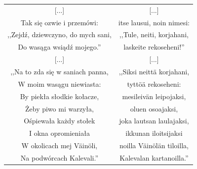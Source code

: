 \documentclass[11pt,a4paper,twoside]{report}
\begin{document}
{\centering
\small
\begin{longtable}{c c}
{[...]} & {[...]}\\
Tak się ozwie i przemówi: & itse lausui, noin nimesi:\\
,,Zejdź, dziewczyno, do mych sani, & ,,Tule, neiti, korjahani,\\
Do wasąga wsiądź mojego.'' & laskeite rekoseheni!''\\ \newpage
{[...]} & {[...]}\\
,,Na to zda się w saniach panna, & ,,Siksi neittä korjahani,\\
W moim wasągu niewiasta: & tyttöä rekoseheni:\\
By piekła słodkie kołacze, & mesileivän leipojaksi,\\
Żeby piwo mi warzyła, & oluen osoajaksi,\\
Ośpiewała każdy stołek & joka lautsan laulajaksi,\\
I okna opromieniała & ikkunan iloitsijaksi\\
W okolicach mej Väinöli, & noilla Väinölän tiloilla,\\
Na podwórcach Kalevali.'' & Kalevalan kartanoilla.''\\
\end{longtable}
}
\vspace*{0.5\baselineskip}
\end{document}
